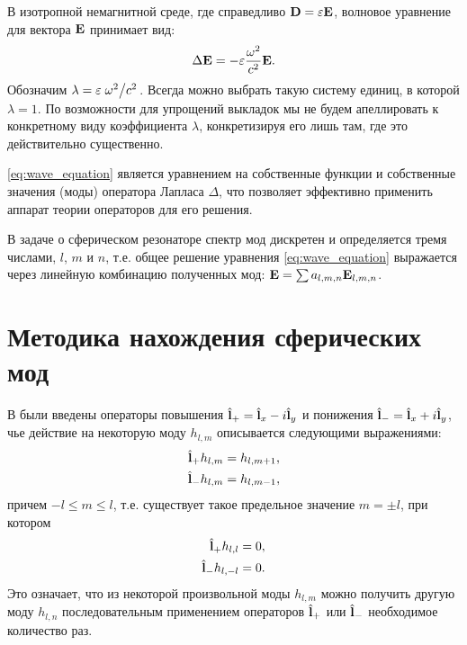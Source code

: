 \documentclass[12pt,a4paper]{article}
\begin{document}
        В изотропной немагнитной среде, где справедливо $\mathbf{D} = \varepsilon \mathbf{E}$, волновое уравнение для вектора $\mathbf{E}$ принимает вид:
        \begin{equation}\label{eq:wave_equation}
            \Delta \mathbf{E} = - \varepsilon \frac{\omega^2}{c^2} \mathbf{E} .
        \end{equation}
        Обозначим $\lambda = \varepsilon \flatfrac{\omega^2}{c^2}$. Всегда можно выбрать такую систему единиц, в которой $\lambda = 1$. По возможности для упрощений выкладок мы не будем апеллировать к конкретному виду коэффициента $\lambda$, конкретизируя его лишь там, где это действительно существенно.

        \autoref{eq:wave_equation} является уравнением на собственные функции и собственные значения (моды) оператора Лапласа $\Delta$, что позволяет эффективно применить аппарат теории операторов для его решения.

        В задаче о сферическом резонаторе спектр мод дискретен и определяется тремя числами, $l$, $m$ и $n$, т.е. общее решение уравнения \autoref{eq:wave_equation} выражается через линейную комбинацию полученных мод: $\mathbf{E} = \sum a_{l,m,n} \mathbf{E}_{l,m,n}$.


    \section{Методика нахождения сферических мод}

        В \cite{math_appendix} были введены операторы повышения $\hat{\mathbf{l}}_{+} = \hat{\mathbf{l}}_x - i \hat{\mathbf{l}}_y$ и понижения $\hat{\mathbf{l}}_{-} = \hat{\mathbf{l}}_x + i \hat{\mathbf{l}}_y$, чье действие на некоторую моду $h_{l, m}$ описывается следующими выражениями:
        \begin{equation}\begin{aligned}
            \hat{\mathbf{l}}_{+} h_{l, m} &= h_{l, m+1} , \\
            \hat{\mathbf{l}}_{-} h_{l, m} &= h_{l, m-1} ,
        \end{aligned}\end{equation}
        причем $- l \le m \le l$, т.е. существует такое предельное значение $m = \pm l$, при котором
        \begin{equation}\begin{aligned}
            \hat{\mathbf{l}}_{+} h_{l, l}   &= 0 , \\
            \hat{\mathbf{l}}_{-} h_{l, - l} &= 0 .
        \end{aligned}\end{equation}
        Это означает, что из некоторой произвольной моды $h_{l, m}$ можно получить другую моду $h_{l, n}$ последовательным применением операторов $\hat{\mathbf{l}}_{+}$ или $\hat{\mathbf{l}}_{-}$ необходимое количество раз.
\end{document}

